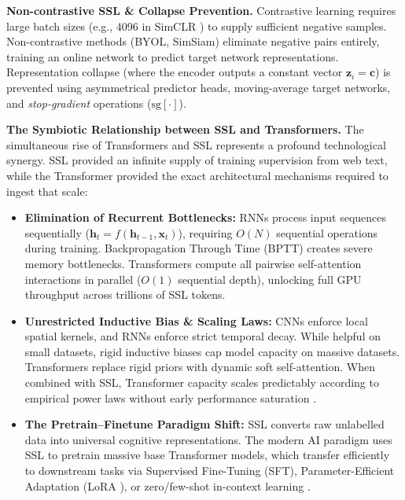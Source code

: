 \documentclass[11pt,a4paper]{article}
\begin{document}
	\textbf{Non-contrastive SSL \& Collapse Prevention.} Contrastive learning requires large batch sizes (e.g., 4096 in SimCLR \parencite{chen2020}) to supply sufficient negative samples. Non-contrastive methods (BYOL, SimSiam) eliminate negative pairs entirely, training an online network to predict target network representations. Representation collapse (where the encoder outputs a constant vector $\mathbf{z}_i = \mathbf{c}$) is prevented using asymmetrical predictor heads, moving-average target networks, and \emph{stop-gradient} operations ($\mathrm{sg}[\cdot]$).
	
	\textbf{The Symbiotic Relationship between SSL and Transformers.} The simultaneous rise of Transformers \parencite{vaswani2017} and SSL represents a profound technological synergy. SSL provided an infinite supply of training supervision from web text, while the Transformer provided the exact architectural mechanisms required to ingest that scale:
	\begin{itemize}
		\item \textbf{Elimination of Recurrent Bottlenecks:} RNNs process input sequences sequentially ($\mathbf{h}_t = f(\mathbf{h}_{t-1}, \mathbf{x}_t)$), requiring $O(N)$ sequential operations during training. Backpropagation Through Time (BPTT) creates severe memory bottlenecks. Transformers compute all pairwise self-attention interactions in parallel ($O(1)$ sequential depth), unlocking full GPU throughput across trillions of SSL tokens.
		\item \textbf{Unrestricted Inductive Bias \& Scaling Laws:} CNNs enforce local spatial kernels, and RNNs enforce strict temporal decay. While helpful on small datasets, rigid inductive biases cap model capacity on massive datasets. Transformers replace rigid priors with dynamic soft self-attention. When combined with SSL, Transformer capacity scales predictably according to empirical power laws without early performance saturation \parencite{kaplan2020, hoffmann2022}.
		\item \textbf{The Pretrain--Finetune Paradigm Shift:} SSL converts raw unlabelled data into universal cognitive representations. The modern AI paradigm uses SSL to pretrain massive base Transformer models, which transfer efficiently to downstream tasks via Supervised Fine-Tuning (SFT), Parameter-Efficient Adaptation (LoRA \parencite{hu2021}), or zero/few-shot in-context learning \parencite{brown2020}.
	\end{itemize}

	\begin{practicebox}

	\end{practicebox}
	
\end{document}
